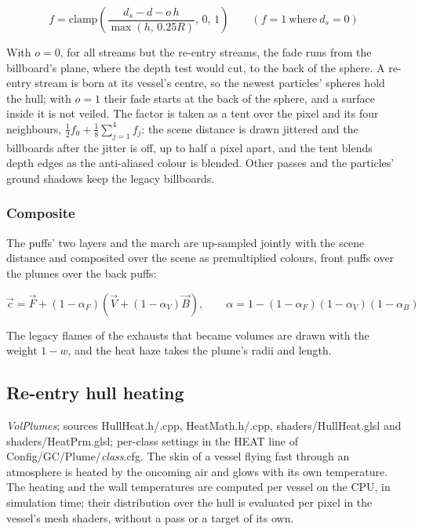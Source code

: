 \documentclass[Orbiter Technical Reference.tex]{subfiles}
\begin{document}
\begin{sloppypar}
\[ f = \mathrm{clamp}\left(\frac{d_{s} - d - o\,h}{\max(h,\, 0.25R)},\, 0,\, 1\right) \qquad (f = 1 \mathrm{\ where\ } d_{s} = 0) \]

\noindent
With $o = 0$, for all streams but the re-entry streams, the fade runs from the billboard's plane, where the depth test would cut, to the back of the sphere. A re-entry stream is born at its vessel's centre, so the newest particles' spheres hold the hull; with $o = 1$ their fade starts at the back of the sphere, and a surface inside it is not veiled. The factor is taken as a tent over the pixel and its four neighbours, $\frac{1}{2}f_{0} + \frac{1}{8}\sum_{j=1}^{4} f_{j}$: the scene distance is drawn jittered and the billboards after the jitter is off, up to half a pixel apart, and the tent blends depth edges as the anti-aliased colour is blended. Other passes and the particles' ground shadows keep the legacy billboards.

\subsubsection{Composite}
The puffs' two layers and the march are up-sampled jointly with the scene distance \cite{kopf2007} and composited over the scene as premultiplied colours, front puffs over the plumes over the back puffs:

\[ \vec{c} = \vec{F} + (1 - \alpha_{F})\left(\vec{V} + (1 - \alpha_{V})\vec{B}\right), \qquad \alpha = 1 - (1 - \alpha_{F})(1 - \alpha_{V})(1 - \alpha_{B}) \]

\noindent
The legacy flames of the exhausts that became volumes are drawn with the weight $1 - w$, and the heat haze takes the plume's radii and length.



\subsection{Re-entry hull heating}\label{sec:vk_heat}
\textit{VolPlumes}; sources HullHeat.h/.cpp, HeatMath.h/.cpp, shaders/HullHeat.glsl and shaders/HeatPrm.glsl; per-class settings in the HEAT line of Config/GC/Plume/\textit{class}.cfg. The skin of a vessel flying fast through an atmosphere is heated by the oncoming air and glows with its own temperature. The heating and the wall temperatures are computed per vessel on the CPU, in simulation time; their distribution over the hull is evaluated per pixel in the vessel's mesh shaders, without a pass or a target of its own.


\end{sloppypar}
\end{document}
